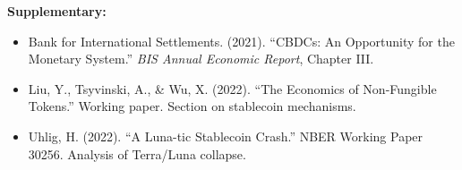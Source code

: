 \documentclass[11pt,a4paper]{article}
\begin{document}
\textbf{Supplementary:}
\begin{itemize}
    \item Bank for International Settlements. (2021). ``CBDCs: An Opportunity for the Monetary System.'' \textit{BIS Annual Economic Report}, Chapter III.
    \item Liu, Y., Tsyvinski, A., \& Wu, X. (2022). ``The Economics of Non-Fungible Tokens.'' Working paper. Section on stablecoin mechanisms.
    \item Uhlig, H. (2022). ``A Luna-tic Stablecoin Crash.'' NBER Working Paper 30256. Analysis of Terra/Luna collapse.
\end{itemize}

\end{document}
